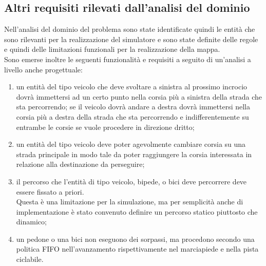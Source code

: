 \subsection{Altri requisiti rilevati dall'analisi del dominio}
Nell'analisi del dominio del problema sono state identificate quindi le entità
che sono rilevanti per la realizzazione del simulatore e sono state definite
delle regole e quindi delle limitazioni funzionali per la realizzazione della
mappa. \\
Sono emerse inoltre le seguenti funzionalità e requisiti a seguito di
un'analisi a livello anche progettuale:
\begin{enumerate}
\item un entità del tipo veicolo che deve svoltare a sinistra al prossimo
incrocio dovrà immettersi ad un certo punto nella corsia più a sinistra della
strada che sta percorrendo; se il veicolo dovrà andare a destra dovrà
immettersi nella corsia più a destra della strada che sta percorrendo e
indifferentemente su entrambe le corsie se vuole procedere in direzione dritto;
\item un entità del tipo veicolo deve poter agevolmente cambiare corsia su una
strada principale in modo tale da poter raggiungere la corsia interessata in
relazione alla destinazione da perseguire;
\item il percorso che l'entità di tipo veicolo, bipede, o bici deve percorrere
deve essere fissato a priori. \\
Questa è una limitazione per la simulazione, ma per semplicità anche di
implementazione è stato convenuto definire un percorso statico piuttosto che
dinamico;
\item un pedone o una bici non eseguono dei sorpassi, ma procedono secondo una
politica \ac{FIFO} nell'avanzamento rispettivamente nel marciapiede e nella
pista ciclabile.
\end{enumerate}

\newpage

